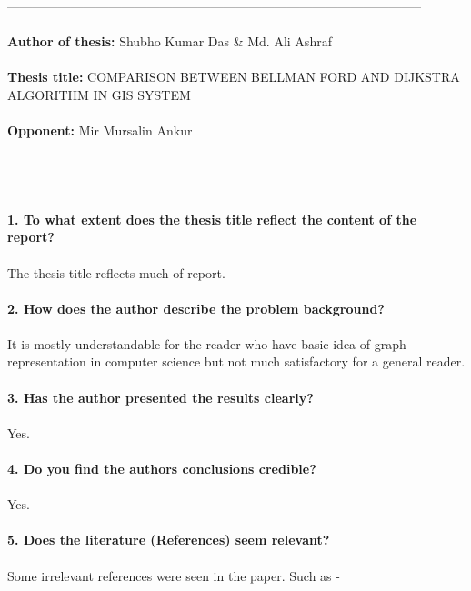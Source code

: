 \documentclass[11pt,english]{article}
\begin{document}

\vspace{10pt}

\\
\vspace{10pt}
{--------------------------------------------------------------------------------------------------}\\\\
{\large \textbf{Author of thesis: }}Shubho Kumar Das \& Md. Ali Ashraf\\\\
{\large \textbf{Thesis title: }}COMPARISON BETWEEN BELLMAN FORD AND DIJKSTRA ALGORITHM IN GIS SYSTEM\\\\
{\large \textbf{Opponent: }}Mir Mursalin Ankur\\\\
\\\\\\
{\large \textbf{1. To what extent does the thesis title reflect the content of the report?}}\\\\
The thesis title reflects much of  report.\\\\
{\large \textbf{2. How does the author describe the problem background?}}\\\\
It is mostly understandable for the reader who have basic idea of graph representation in computer science but not much satisfactory for a general reader.\\\\
{\large \textbf{3. Has the author presented the results clearly?}}\\\\
Yes.\\\\
{\large \textbf{4. Do you find the author\textsc{}s conclusions credible?}}\\\\
Yes.\\\\
{\large \textbf{5. Does the literature (References) seem relevant?}}\\\\
Some irrelevant references were seen in the paper. Such as -\\
\end{document}

